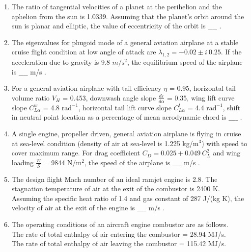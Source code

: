 \documentclass[journal]{IEEEtran}
\begin{document}
\begin{enumerate}
\item The ratio of tangential velocities of a planet at the perihelion and the aphelion from the sun is 1.0339. Assuming that the planet's orbit around the sun is planar and elliptic, the value of eccentricity of the orbit is $\_\_\_\_$ . \\
\item The eigenvalues for phugoid mode of a general aviation airplane at a stable cruise flight condition at low angle of attack are $\lambda_{1,2} = -0.02 \pm i\ 0.25$. If the acceleration due to gravity is 9.8 $m/\text{s}^2$, the equilibrium speed of the airplane is $\_\_\_\_$ m/s . \\
\item For a general aviation airplane with tail efficiency $\eta$ = 0.95, horizontal tail volume ratio $V_H$ = 0.453, downwash angle slope $\frac{d\varepsilon}{d\alpha}$ = 0.35, wing lift curve slope $C_{L\alpha}^{w}$ = 4.8 $\text{rad}^{-1}$, horizontal tail lift curve slope $C_{L\alpha}^{t}$ = 4.4 $\text{rad}^{-1}$, shift in neutral point location as a percentage of mean aerodynamic chord is $\_\_\_\_$ . \\
\item A single engine, propeller driven, general aviation airplane is flying in cruise at sea-level condition (density of air at sea-level is 1.225 kg/$\text{m}^3$) with speed to cover maximum range. For drag coefficient $C_D = 0.025 + 0.049\ C_L^2$ and wing loading $\frac{W}{S}$ = 9844 N/$\text{m}^2$, the speed of the airplane is $\_\_\_\_$ m/s . \\
\item The design flight Mach number of an ideal ramjet engine is 2.8. The stagnation temperature of air at the exit of the combustor is 2400 K. Assuming the specific heat ratio of 1.4 and gas constant of 287 J/(kg K), the velocity of air at the exit of the engine is $\_\_\_\_$ m/s . \\
\item The operating conditions of an aircraft engine combustor are as follows. \\
The rate of total enthalpy of air entering the combustor = 28.94 MJ/s. \\
The rate of total enthalpy of air leaving the combustor = 115.42 MJ/s. \\

\end{enumerate}
\end{document}
